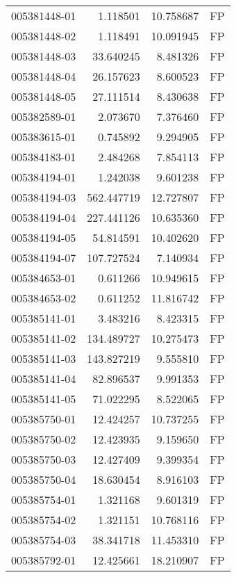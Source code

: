 \begin{tabular}{lrrl}
005381448-01 &    1.118501 &      10.758687 &   FP \\
005381448-02 &    1.118491 &      10.091945 &   FP \\
005381448-03 &   33.640245 &       8.481326 &   FP \\
005381448-04 &   26.157623 &       8.600523 &   FP \\
005381448-05 &   27.111514 &       8.430638 &   FP \\
005382589-01 &    2.073670 &       7.376460 &   FP \\
005383615-01 &    0.745892 &       9.294905 &   FP \\
005384183-01 &    2.484268 &       7.854113 &   FP \\
005384194-01 &    1.242038 &       9.601238 &   FP \\
005384194-03 &  562.447719 &      12.727807 &   FP \\
005384194-04 &  227.441126 &      10.635360 &   FP \\
005384194-05 &   54.814591 &      10.402620 &   FP \\
005384194-07 &  107.727524 &       7.140934 &   FP \\
005384653-01 &    0.611266 &      10.949615 &   FP \\
005384653-02 &    0.611252 &      11.816742 &   FP \\
005385141-01 &    3.483216 &       8.423315 &   FP \\
005385141-02 &  134.489727 &      10.275473 &   FP \\
005385141-03 &  143.827219 &       9.555810 &   FP \\
005385141-04 &   82.896537 &       9.991353 &   FP \\
005385141-05 &   71.022295 &       8.522065 &   FP \\
005385750-01 &   12.424257 &      10.737255 &   FP \\
005385750-02 &   12.423935 &       9.159650 &   FP \\
005385750-03 &   12.427409 &       9.399354 &   FP \\
005385750-04 &   18.630454 &       8.916103 &   FP \\
005385754-01 &    1.321168 &       9.601319 &   FP \\
005385754-02 &    1.321151 &      10.768116 &   FP \\
005385754-03 &   38.341718 &      11.453310 &   FP \\
005385792-01 &   12.425661 &      18.210907 &   FP \\

\end{tabular}
